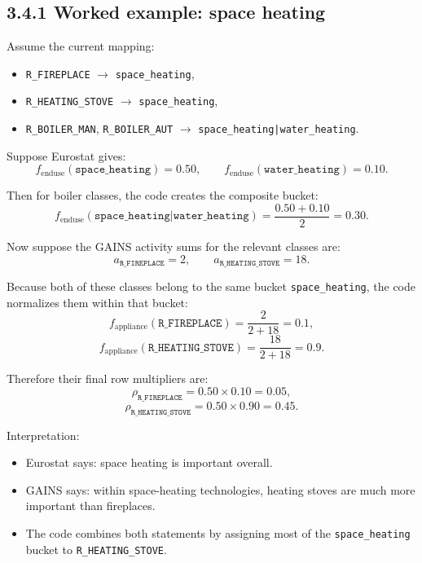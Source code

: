 \documentclass[11pt,a4paper]{article}
\begin{document}
\subsection{3.4.1 Worked example: space heating}

Assume the current mapping:

\begin{itemize}[leftmargin=1.4em]
  \item \texttt{R\_FIREPLACE} $\rightarrow$ \texttt{space\_heating},
  \item \texttt{R\_HEATING\_STOVE} $\rightarrow$ \texttt{space\_heating},
  \item \texttt{R\_BOILER\_MAN}, \texttt{R\_BOILER\_AUT} $\rightarrow$ \texttt{space\_heating|water\_heating}.
\end{itemize}

Suppose Eurostat gives:
\[
f_{\mathrm{enduse}}(\texttt{space\_heating}) = 0.50,
\qquad
f_{\mathrm{enduse}}(\texttt{water\_heating}) = 0.10.
\]

Then for boiler classes, the code creates the composite bucket:
\[
f_{\mathrm{enduse}}(\texttt{space\_heating|water\_heating})
= \frac{0.50 + 0.10}{2} = 0.30.
\]

Now suppose the GAINS activity sums for the relevant classes are:
\[
a_{\texttt{R\_FIREPLACE}} = 2,
\qquad
a_{\texttt{R\_HEATING\_STOVE}} = 18.
\]

Because both of these classes belong to the same bucket \texttt{space\_heating},
the code normalizes them within that bucket:
\[
f_{\mathrm{appliance}}(\texttt{R\_FIREPLACE}) = \frac{2}{2+18} = 0.1,
\]
\[
f_{\mathrm{appliance}}(\texttt{R\_HEATING\_STOVE}) = \frac{18}{2+18} = 0.9.
\]

Therefore their final row multipliers are:
\[
\rho_{\texttt{R\_FIREPLACE}} = 0.50 \times 0.10 = 0.05,
\]
\[
\rho_{\texttt{R\_HEATING\_STOVE}} = 0.50 \times 0.90 = 0.45.
\]

Interpretation:

\begin{itemize}[leftmargin=1.4em]
  \item Eurostat says: space heating is important overall.
  \item GAINS says: within space-heating technologies, heating stoves are much more important than fireplaces.
  \item The code combines both statements by assigning most of the
  \texttt{space\_heating} bucket to \texttt{R\_HEATING\_STOVE}.
\end{itemize}
\end{document}
